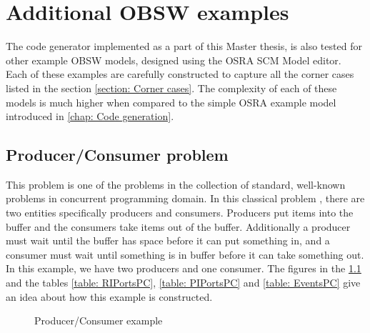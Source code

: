 $  $%
\chapter{Additional OBSW examples}
\label{chap: Extra examples}

The code generator implemented as a part of this Master thesis, is also tested for other example OBSW models, designed using the OSRA SCM Model editor. Each of these examples are carefully constructed to capture all the corner cases listed in the section \cref{section: Corner cases}. The complexity of each of these models is much higher when compared to the simple OSRA example model introduced in \cref{chap: Code generation}.

\section{Producer/Consumer problem}
This problem is one of the problems in the collection of standard, well-known problems in concurrent programming domain. In this classical problem \cite{ProducerConsumer}, there are two entities specifically producers and consumers. Producers put items into the buffer and the consumers take items out of the buffer. Additionally a producer must wait until the buffer has space before it can put something in, and a consumer must wait until something is in buffer before it can take something out. In this example, we have two producers and one consumer. The figures in the \cref{fig: FiguresPC} and the tables \cref{table: RIPortsPC}, \cref{table: PIPortsPC} and \cref{table: EventsPC} give an idea about how this example is constructed.   

\begin{figure}[h]
	\centering
	\hfill
	\hfill
	\label{fig: FiguresPC}
	\caption{Producer/Consumer example}
\end{figure}

